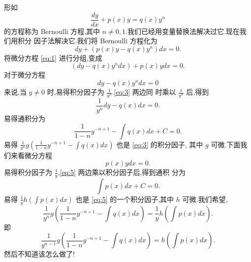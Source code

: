 \documentclass[a4paper, 12pt]{article} %
\begin{document}
\ni 形如
$$
\frac{dy}{dx}+p(x)y=q(x)y^n
$$
的方程称为 Bernoulli 方程,其中 $n\neq 0,1$.我们已经用变量替换法解决过它.现在我们用积分
因子法解决它.我们将 Bernoulli 方程化为
\begin{equation}
  \label{eq:1}
  dy+(p(x)y-q(x)y^n)dx=0.
\end{equation}
将微分方程 \eqref{eq:1} 进行分组,变成
\begin{equation}
  \label{eq:2}
  (dy-q(x)y^{n}dx)+p(x)ydx=0.
\end{equation}
对于微分方程
\begin{equation}
  \label{eq:3}
  dy-q(x)y^{n}dx=0
\end{equation}
来说,当 $y\neq 0$ 时,易得积分因子为 $\frac{1}{y^{n}}$.\eqref{eq:3} 两边同
时乘以 $\frac{1}{y^{n}}$ 后,得到
\begin{equation}
  \label{eq:4}
  \frac{1}{y^{n}}dy-q(x)dx=0.
\end{equation}
易得通积分为
$$
\frac{1}{1-n}y^{-n+1}-\int q(x)dx+C=0.
$$
易得 $\frac{1}{y^{n}}g(\frac{1}{1-n}y^{-n+1}-\int q(x)dx)$ 也是 \eqref{eq:3} 的积分因子,
其中 $g$ 可微.下面我们来看微分方程
\begin{equation}
  \label{eq:5}
  p(x)ydx=0.
\end{equation}
易得积分因子为 $\frac{1}{y}$,\eqref{eq:5} 两边乘以积分因子后,得到通积
分为
$$
\int p(x)dx+C=0.
$$
易得 $\frac{1}{y}h(\int p(x)dx)$ 也是 \eqref{eq:5} 的一个积分因子,其中
$h$ 可微.我们希望,
$$
\frac{1}{y^n}g(\frac{1}{1-n}y^{-n+1}-\int q(x)dx)=\frac{1}{y}h(\int p(x)dx).
$$
即
$$
\frac{1}{y^{n-1}}g(\frac{1}{1-n}y^{-n+1}-\int q(x)dx)=h(\int p(x)dx).
$$
然后不知道该怎么做了!









\end{document}
